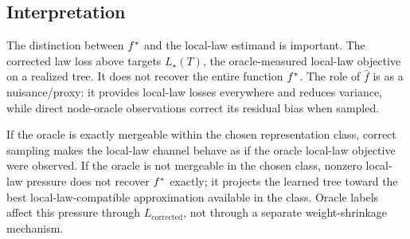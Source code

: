 \subsection{Interpretation}
\label{app:drlaw-interpretation}

The distinction between \(f^\ast\) and the local-law estimand is
important. The corrected law loss above targets
\(L_\star(T)\), the oracle-measured local-law objective on a realized
tree. It does not recover the entire function \(f^\ast\). The role of
\(\widehat f\) is as a nuisance/proxy: it provides local-law losses
everywhere and reduces variance, while direct node-oracle observations
correct its residual bias when sampled.

If the oracle is exactly mergeable within the chosen representation
class, correct sampling makes the local-law channel behave as if the
oracle local-law objective were observed. If the oracle is not
mergeable in the chosen class, nonzero local-law pressure does not
recover \(f^\ast\) exactly; it projects the learned tree toward the
best local-law-compatible approximation available in the class. Oracle
labels affect this pressure through \(L_{\mathrm{corrected}}\), not
through a separate weight-shrinkage mechanism.
